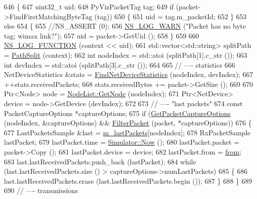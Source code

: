 \begin{DoxyCode}
646 \{
647   uint32\_t uid;
648   PyVizPacketTag tag;
649   \textcolor{keywordflow}{if} (packet->FindFirstMatchingByteTag (tag))
650     \{
651       uid = tag.m\_packetId;
652     \}
653   \textcolor{keywordflow}{else}
654     \{
655       \textcolor{comment}{//NS\_ASSERT (0);}
656       \hyperlink{group__logging_gade7208b4009cdf0e25783cd26766f559}{NS\_LOG\_WARN} (\textcolor{stringliteral}{"Packet has no byte tag; wimax link?"});
657       uid = packet->GetUid ();
658     \}
659 
660   \hyperlink{log-macros-disabled_8h_a90b90d5bad1f39cb1b64923ea94c0761}{NS\_LOG\_FUNCTION} (context << uid);
661   std::vector<std::string> splitPath = \hyperlink{pyviz_8cc_abfaec39467cd62b64fb7727503d04d44}{PathSplit} (context);
662   \textcolor{keywordtype}{int} nodeIndex = std::atoi (splitPath[1].c\_str ());
663   \textcolor{keywordtype}{int} devIndex = std::atoi (splitPath[3].c\_str ());
664 
665   \textcolor{comment}{// ---- statistics}
666   NetDeviceStatistics &stats = \hyperlink{classns3_1_1PyViz_ac86a6ebd5f988fa103787f3fe9d09113}{FindNetDeviceStatistics} (nodeIndex, devIndex);
667   ++stats.receivedPackets;
668   stats.receivedBytes += packet->GetSize ();
669 
670   Ptr<Node> node = \hyperlink{classns3_1_1NodeList_a80ac09977d48d29db5c704ac8483cf6c}{NodeList::GetNode} (nodeIndex);
671   Ptr<NetDevice> device = node->GetDevice (devIndex);
672 
673   \textcolor{comment}{// ---- "last packets"}
674   \textcolor{keyword}{const} PacketCaptureOptions *captureOptions;
675   \textcolor{keywordflow}{if} (\hyperlink{classns3_1_1PyViz_ae78d7025e4dc17203d654789bc9aa829}{GetPacketCaptureOptions} (nodeIndex, &captureOptions) && 
      \hyperlink{classns3_1_1PyViz_ad92f800fa5f75fc22531f572fe38095d}{FilterPacket} (packet, *captureOptions))
676     \{
677       LastPacketsSample &last = \hyperlink{classns3_1_1PyViz_a55366b9119e42eaa283e43b6bc51c464}{m\_lastPackets}[nodeIndex];
678       RxPacketSample lastPacket;
679       lastPacket.time = \hyperlink{classns3_1_1Simulator_ac3178fa975b419f7875e7105be122800}{Simulator::Now} ();
680       lastPacket.packet = packet->Copy ();
681       lastPacket.device = device;
682       lastPacket.from = \hyperlink{lte__amc_8m_a1b4c81ff74eb1a626b5ade44c81004b3}{from};
683       last.lastReceivedPackets.push\_back (lastPacket);
684       \textcolor{keywordflow}{while} (last.lastReceivedPackets.size () > captureOptions->numLastPackets)
685         \{
686           last.lastReceivedPackets.erase (last.lastReceivedPackets.begin ());
687         \}
688     \}
689 
690   \textcolor{comment}{// ---- transmissions}

\end{DoxyCode}

